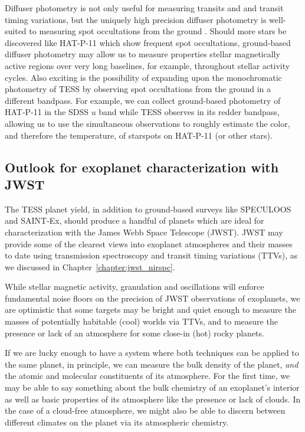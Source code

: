 Diffuser photometry is not only useful for measuring transits and and transit timing variations, but the uniquely high precision diffuser photometry is well-suited to measuring spot occultations from the ground \citep{Morris2018d}. Should more stars be discovered like HAT-P-11 which show frequent spot occultations, ground-based diffuser photometry may allow us to measure properties stellar magnetically active regions over very long baselines, for example, throughout stellar activity cycles. Also exciting is the possibility of expanding upon the monochromatic photometry of TESS by observing spot occultations from the ground in a different bandpass. For example, we can collect ground-based photometry of HAT-P-11 in the SDSS $u$ band while TESS observes in its redder bandpass, allowing us to use the simultaneous observations to roughly estimate the color, and therefore the temperature, of starspots on HAT-P-11 (or other stars). 

\subsection{Outlook for exoplanet characterization with JWST}

The TESS planet yield, in addition to ground-based surveys like SPECULOOS \citep{Delrez2018b} and SAINT-Ex, should produce a handful of planets which are ideal for characterization with the James Webb Space Telescope (JWST). JWST may provide some of the clearest views into exoplanet atmospheres and their masses to date using transmission spectroscopy and transit timing variations (TTVs), as we discussed in Chapter~\ref{chapter:jwst_nirspc}. 

While stellar magnetic activity, granulation and oscillations will enforce fundamental noise floors on the precision of JWST observations of exoplanets, we are optimistic that some targets may be bright and quiet enough to measure the masses of potentially habitable (cool) worlds via TTVs, and to measure the presence or lack of an atmosphere for some close-in (hot) rocky planets. 

If we are lucky enough to have a system where both techniques can be applied to the same planet, in principle, we can measure the bulk density of the planet, {\it and} the atomic and molecular constituents of its atmosphere. For the first time, we may be able to say something about the bulk chemistry of an exoplanet's interior as well as basic properties of its atmosphere like the presence or lack of clouds. In the case of a cloud-free atmosphere, we might also be able to discern between different climates on the planet via its atmospheric chemistry. 

